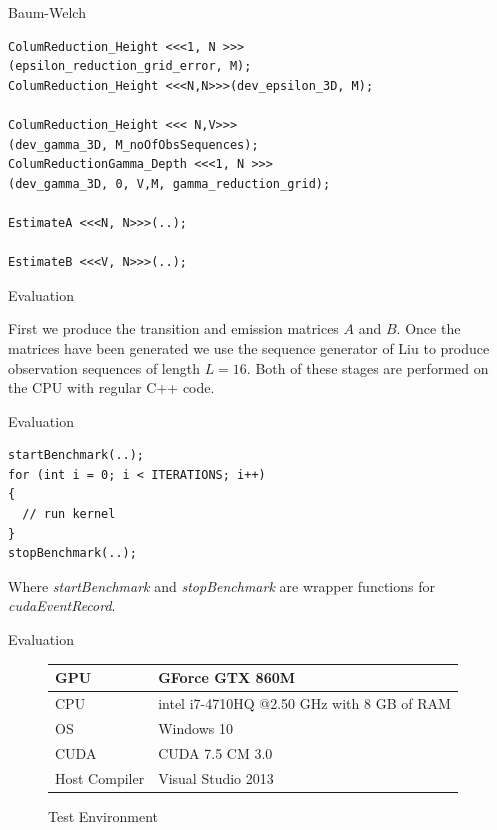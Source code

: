 \documentclass[11pt]{beamer}
\begin{document}
\begin{frame}[fragile]{Baum-Welch}
\begin{verbatim}
ColumReduction_Height <<<1, N >>>
(epsilon_reduction_grid_error, M);
ColumReduction_Height <<<N,N>>>(dev_epsilon_3D, M);

ColumReduction_Height <<< N,V>>>
(dev_gamma_3D, M_noOfObsSequences);
ColumReductionGamma_Depth <<<1, N >>>
(dev_gamma_3D, 0, V,M, gamma_reduction_grid);

EstimateA <<<N, N>>>(..);

EstimateB <<<V, N>>>(..);
\end{verbatim}
\end{frame}

\begin{frame}{Evaluation}

 First we produce the transition and emission matrices $A$ and $B$. 
 Once the matrices have been generated we use the sequence generator of Liu to produce observation sequences of length $L = 16$. Both of these stages are performed on the CPU with regular C++ code.

\end{frame}

\begin{frame}[fragile]{Evaluation}

\begin{verbatim}
startBenchmark(..);
for (int i = 0; i < ITERATIONS; i++)
{
  // run kernel
}
stopBenchmark(..);
\end{verbatim}
Where \textit{startBenchmark} and \textit{stopBenchmark} are wrapper functions for \textit{cudaEventRecord}.

\end{frame}

\begin{frame}{Evaluation}
\begin{figure}[H]
\centering
\begin{tabular}{|l|l|}
\hline
GPU &GForce GTX 860M \\ \hline
CPU & intel i7-4710HQ @2.50 GHz with 8 GB of RAM  \\ \hline
OS & Windows 10 \\ \hline
CUDA & CUDA 7.5 CM 3.0 \\ \hline
Host Compiler & Visual Studio 2013 \\ \hline

\end{tabular}

\caption{Test Environment}
\end{figure}
\end{frame}
\end{document}
